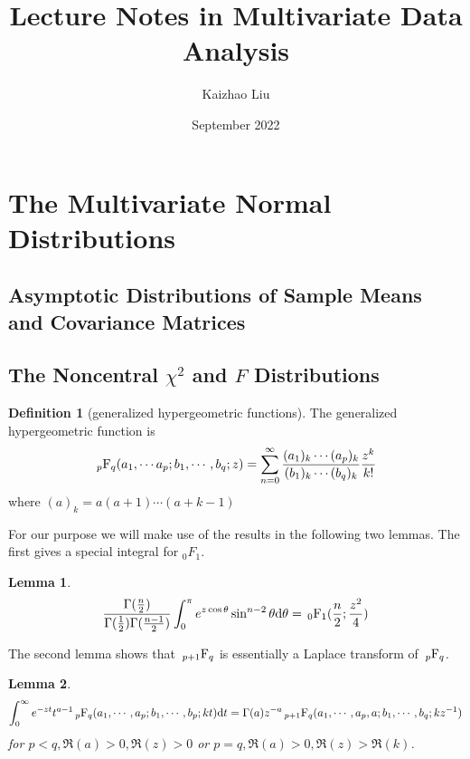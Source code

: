 \documentclass{article}
\title{Lecture Notes in Multivariate Data Analysis}
\author{Kaizhao Liu}
\date{September 2022}
\newtheorem{Lem}{Lemma}[section]
\theoremstyle{definition}
\newtheorem{Def}{Definition}[section]
\begin{document}
\maketitle
\tableofcontents
\section{The Multivariate Normal Distributions}
\subsection{Asymptotic Distributions of Sample Means and Covariance Matrices}


\subsection{The Noncentral \texorpdfstring{$\chi^2$}{} and \texorpdfstring{$F$}{} Distributions}
\begin{Def}[generalized hypergeometric functions]
The generalized hypergeometric function is
\[\sideset{_{p}}{_q}{\operatorname{F}} (a_1,\cdots a_p;b_1,\cdots,b_q;z)=\sum_{n=0}^\infty \frac{(a_1)_k\cdots (a_p)_k}{(b_1)_k\cdots (b_q)_k}\frac{z^k}{k!}\]
where $(a)_k=a(a+1)\cdots (a+k-1)$
\end{Def}

For our purpose we will make use of the results in the following two lemmas. The first gives a special integral for $_0F_1$.
\begin{Lem}
\[\frac{\Gamma(\frac{n}{2})}{\Gamma(\frac{1}{2})\Gamma(\frac{n-1}{2})}\int_0^\pi e^{z\cos \theta}\sin^{n-2}\theta\mathrm{d}\theta=\sideset{_0}{_1}{\operatorname{F}}(\frac{n}{2};\frac{z^2}{4})\]
\end{Lem}
The second lemma shows that $\sideset{_{p+1}}{_q}{\operatorname{F}}$ is essentially a Laplace transform of $\sideset{_p}{_q}{\operatorname{F}}$.
\begin{Lem}
\[\int_0^\infty e^{-zt}t^{a-1}\sideset{_p}{_q}{\operatorname{F}}(a_1,\cdots,a_p;b_1,\cdots,b_p;kt)\mathrm{d}t=\Gamma(a)z^{-a}\sideset{_{p+1}}{_q}{\operatorname{F}}(a_1,\cdots,a_p,a;b_1,\cdots,b_q;kz^{-1})\]
for $p<q,\Re(a)>0,\Re(z)>0$ or $p=q,\Re(a)>0,\Re(z)>\Re(k)$.
\end{Lem}
\end{document}
